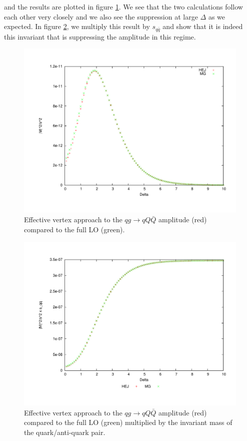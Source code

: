 and the results are plotted in figure \ref{fig:qg_qqqx}. We see that the two calculations follow each other very closely and we also see the suppression at large $\Delta$ as we expected. In figure \ref{fig:qg_qqqx_sqqx}, we multiply this result by $s_{q \bar{q}}$ and show that it is indeed this invariant that is suppressing the amplitude in this regime. 

\begin{figure}[H]
\centering
\includegraphics[scale= 0.45]{Images/qg_qqqx.pdf}
\caption{Effective vertex approach to the $qg \to qQ\bar{Q}$ amplitude (red) compared to the full LO (green).}
\label{fig:qg_qqqx}
\end{figure}

\begin{figure}[H]
\centering
\includegraphics[scale=0.45]{Images/qg_qQQx_sqqx.pdf}
\caption{Effective vertex approach to the $qg \to qQ\bar{Q}$ amplitude (red) compared to the full LO (green) multiplied by the invariant mass of the quark/anti-quark pair.}
\label{fig:qg_qqqx_sqqx}
\end{figure}

